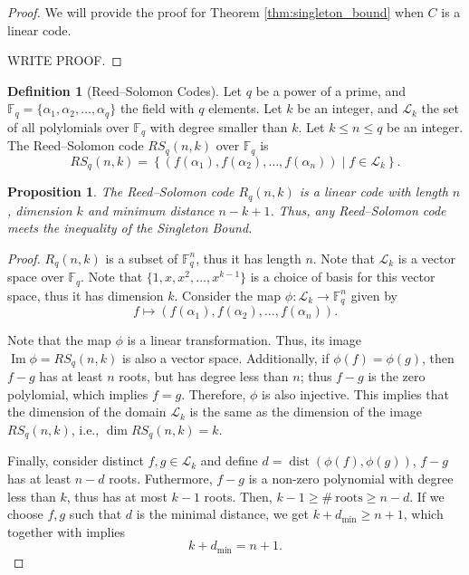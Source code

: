 \documentclass[11pt]{amsart}
\theoremstyle{theorem}
\newtheorem{prop}[thm]{Proposition}
\theoremstyle{definition}
\newtheorem{defn}[thm]{Definition}
\theoremstyle{example}
\theoremstyle{remark}
\numberwithin{equation}{section}
\DeclareMathOperator{\dist}{dist}
\DeclareMathOperator{\Ima}{Im}
\DeclareMathOperator{\dimension}{dim}
\begin{document}
\begin{proof}
	We will provide the proof for Theorem \ref{thm:singleton_bound} when $C$ is a linear code.
	
	WRITE PROOF.
\end{proof}

\begin{defn}[Reed--Solomon Codes]
	Let $q$ be a power of a prime, and $\mathbb{F}_q = \{\alpha_1, \alpha_2, \dots, \alpha_q\}$ the field with $q$ elements. Let $k$ be an integer, and $\mathcal{L}_k$ the set of all polylomials over $\mathbb{F}_q$ with degree smaller than $k$. Let $k \le n \le q$ be an integer. The Reed--Solomon code $RS_q(n, k)$ over $\mathbb{F}_q$ is 
	\begin{equation}
		RS_q(n, k) = \left\{\left(f(\alpha_1), f(\alpha_2), \dots, f(\alpha_n)\right) \mid f \in \mathcal{L}_k\right\}.
	\end{equation}
\end{defn}

\begin{prop}
	The Reed--Solomon code $R_q(n, k)$ is a linear code with length $n$, dimension $k$ and minimum distance $n - k + 1$.
	Thus, any Reed--Solomon code meets the inequality of the Singleton Bound.
\end{prop}

\begin{proof}
	$R_q(n, k)$ is a subset of $\mathbb{F}_q^n$, thus it has length $n$.  
	Note that $\mathcal L_k$ is a vector space over $\mathbb{F}_q$. Note that $\{1, x, x^2, \dots, x^{k-1}\}$ is a choice of basis for this vector space, thus it has dimension $k$. Consider the map $\phi: \mathcal L_k \to \mathbb{F}_q^n$ given by 
	\begin{equation}
		f \mapsto (f(\alpha_1), f(\alpha_2), \dots, f(\alpha_n)).
	\end{equation}

	Note that the map $\phi$ is a linear transformation. Thus, its image $\Ima \phi = RS_q(n, k)$ is also a vector space.  
	Additionally, if $\phi(f) = \phi(g)$, then $f - g$ has at least $n$ roots, but has degree less than $n$; thus $f - g$ is the zero polylomial, which implies $f = g$. Therefore, $\phi$ is also injective. This implies that the dimension of the domain $\mathcal L_k$ is the same as the dimension of the image $RS_q(n, k)$, i.e.,  $\dimension RS_q(n, k) = k$.
	
	Finally, consider distinct $f, g \in \mathcal L_k$ and define $d = \dist(\phi(f), \phi(g))$, $f - g$ has at least $n - d$ roots. Futhermore, $f - g$ is a non-zero polynomial with degree less than $k$, thus has at most $k - 1$ roots. Then,  $ k - 1 \ge \#\ \text{roots} \ge n - d$.
	If we choose $f, g$ such that $d$ is the minimal distance, we get $k + d_{\mathrm{min}} \ge n + 1$, which together with  implies 
	\begin{equation}
		k + d_\text{min} = n + 1.
	\end{equation}

\end{proof}
\end{document}
